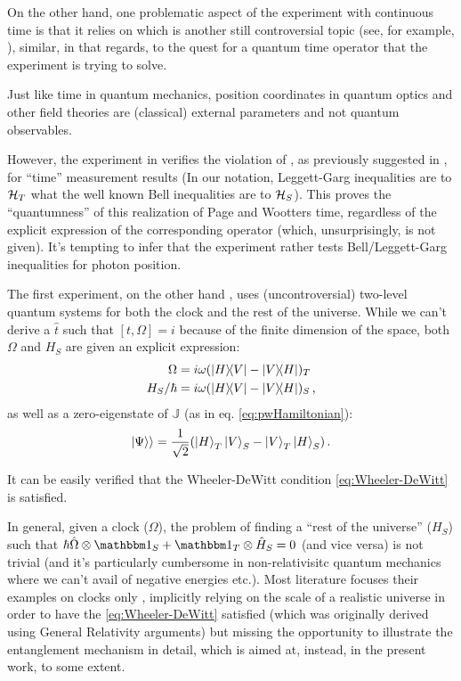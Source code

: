 On the other hand, one problematic aspect of the experiment with continuous time
is that
it relies on  which is another
still controversial topic (see, for example, \cite{HawtonPhotonPosition}),
similar, in that regards, to the quest for a quantum time operator that the experiment is trying to solve.

Just like time in quantum mechanics, position coordinates in quantum optics and other field theories
are (classical) external parameters and not quantum observables. 

However, the experiment in \cite{Moreva_position} verifies the violation of
, as previously suggested in \cite{LeggettGarg+PageWootters},
for ``time'' measurement results
(In our notation, Leggett-Garg inequalities are to $\mathcal{H}_T$ what the well known Bell inequalities
  are to $\mathcal{H}_S$).
This proves the ``quantumness'' of this realization of Page and Wootters time,
regardless of the explicit expression of the corresponding operator (which, unsurprisingly,
is not given). It's tempting to infer that the experiment
rather tests Bell/Leggett-Garg inequalities for photon position.

The first experiment, on the other hand \parencite{Moreva:illustration,Moreva:synthetic},
uses (uncontroversial)
two-level quantum systems for both the clock and the rest of the universe.
While we can't derive a $\hat{t}$ such that $[t, \Omega] = i$
because of the finite dimension of the space, both $\Omega$
and $H_S$ are given an explicit expression:
\begin{align}\label{eq:MorevaOmegaT}
  \Omega            &= i\omega(\ketbra{H}{V}- \ketbra{V}{H})_T \\
  H_S/{\hbar}       &= i\omega(\ketbra{H}{V}- \ketbra{V}{H})_S
  \,\text{,}
\end{align} 
as well as a zero-eigenstate of $\mathbb{J}$ (as in eq. \ref{eq:pwHamiltonian}):
\begin{equation}
  |\Psi\rangle\rangle = \frac{1}{\sqrt{2}}\qty(\ket{H}_T\ket{V}_S-\ket{V}_T\ket{H}_S)
  \,\text{.}
\end{equation}

It can be easily verified that the Wheeler-DeWitt condition
\eqref{eq:Wheeler-DeWitt} is satisfied.

In general, given a clock ($\Omega$), the problem of finding a
``rest of the universe'' ($H_S$) such that
$\hbar\hat{\Omega}\ox\idop_S + \idop_T\ox\hat{H}_S = 0$
(and vice versa)
is not trivial
(and it's particularly cumbersome in non-relativisitc
quantum mechanics where we can't avail of negative energies etc.).
Most literature focuses their examples on clocks only
\parencite{Prvanovic,RealisticClocks,HarmonicClocks},
implicitly relying on the scale of a realistic universe
in order to have the \eqref{eq:Wheeler-DeWitt} satisfied
(which was originally derived using General Relativity arguments)
but missing the opportunity to illustrate the entanglement mechanism in detail,
which is aimed at, instead, in the present work, to some extent.

